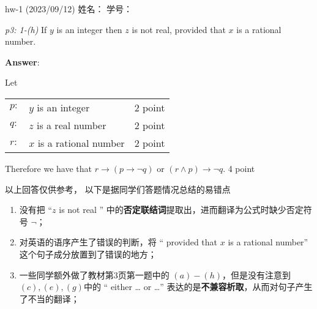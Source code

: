 \documentclass[UTF8,12pt,a4paper]{ctexart}
\begin{document}
	

\begin{center}
hw-1 (2023/09/12) \qquad \qquad 姓名：  \hspace{7em}  学号： 
\end{center}



\emph{p3: 1-(h)} \qquad
If $y$ is an integer then $z$ is not real, provided that $x$ is a rational number.



\textbf{Answer}:

Let 
\begin{table}[h]
	\centering
	\begin{tabular}{l l r }
		$p:$ & $y$ is an integer & {\color{purple} {\footnotesize 2 point}}\\
		
		$q:$ & $z$ is a real number & {\color{purple} {\footnotesize 2 point}}\\
		
		$r:$ & $x$ is a rational number & {\color{purple} {\footnotesize 2 point}} \\
		
	\end{tabular}
\end{table}

Therefore we have that 
$ r \to ( p \to \neg q)$  or $ (r \land  p) \to \neg q$.
\hfill 	{\color{purple} {\footnotesize 4 point}}



\vspace{5em}
\dotfill
以上回答仅供参考，
以下是据同学们答题情况总结的易错点
\dotfill

\begin{enumerate}
\item 没有把\; “$z$ is {\color{red} not} real ” \; 中的\textbf{否定联结词}提取出，进而翻译为公式时缺少否定符号 $\neg$；

\item 对英语的语序产生了错误的判断，将 \; 
“ {\color{red} provided that} $x$ is a rational number” \; 这个句子成分放置到了错误的地方；

\item 一些同学额外做了教材第3页第一题中的 $(a)-(h)$，但是没有注意到$(c),(e),(g)$中的 “{\color{red} either} \dots {\color{red} or} \dots” 表达的是\textbf{不兼容析取}，从而对句子产生了不当的翻译；

\end{enumerate}
\end{document}

